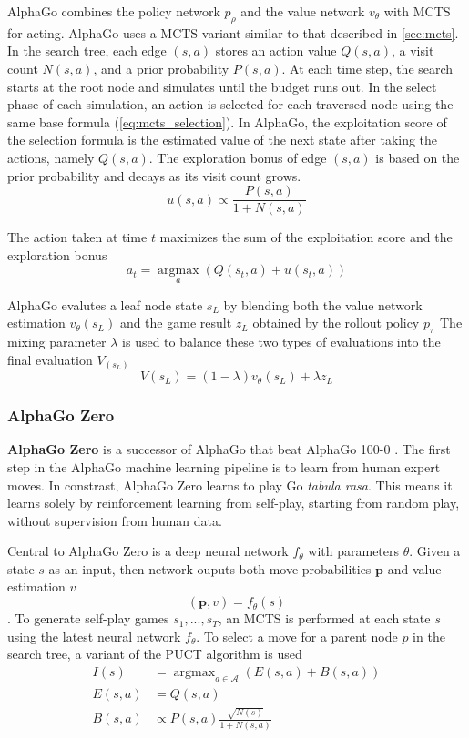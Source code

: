 \documentclass[12pt]{article}
\begin{document}
AlphaGo combines the policy network $p_{\rho}$ and the value network $v_{\theta}$ with MCTS for acting.
AlphaGo uses a MCTS variant similar to that described in \ref{sec:mcts}.
In the search tree, each edge $(s, a)$ stores an action value $Q(s, a)$, a visit count $N(s, a)$, and a prior probability $P(s, a)$.
At each time step, the search starts at the root node and simulates until the budget runs out.
In the select phase of each simulation, an action is selected for each traversed node using the same base formula (\ref{eq:mcts_selection}).
In AlphaGo, the exploitation score of the selection formula is the estimated value of the next state after taking the actions, namely $Q(s, a)$.
The exploration bonus of edge $(s, a)$ is based on the prior probability and decays as its visit count grows.
\begin{equation}
    u(s, a) \propto \frac{P(s, a)}{1 + N(s, a)}
\end{equation}

The action taken at time $t$ maximizes the sum of the exploitation score and the exploration bonus
\begin{equation}
    a_{t}=\underset{a}{\operatorname{argmax}}\left(Q\left(s_{t}, a\right)+u\left(s_{t}, a\right)\right)
\end{equation}

AlphaGo evalutes a leaf node state $s_L$ by blending both the value network estimation $v_\theta(s_L)$ and the game result $z_L$ obtained by the rollout policy $p_\pi$
The mixing parameter $\lambda$ is used to balance these two types of evaluations into the final evaluation $V_(s_L)$
$$
    V\left(s_{L}\right)=(1-\lambda) v_{\theta}\left(s_{L}\right)+\lambda z_{L}
$$

\subsubsection{AlphaGo Zero}
\textbf{AlphaGo Zero} is a successor of AlphaGo that beat AlphaGo 100-0 \cite{MasteringGameGo_Silver.Schrittwieser.ea_2017}.
The first step in the AlphaGo machine learning pipeline is to learn from human expert moves.
In constrast, AlphaGo Zero learns to play Go \textit{tabula rasa}.
This means it learns solely by reinforcement learning from self-play, starting from random play, without supervision from human data.

Central to AlphaGo Zero is a deep neural network $f_\theta$ with parameters $\theta$.
Given a state $s$ as an input, then network ouputs both move probabilities $\pmb{p}$ and value estimation $v$
$$(\pmb{p}, v) = f_\theta(s)$$.
To generate self-play games $s_1, ..., s_T$, an MCTS is performed at each state $s$ using the latest neural network $f_\theta$.
To select a move for a parent node $p$ in the search tree, a variant of the PUCT algorithm is used
\begin{align*}
    I(s)     & = \operatorname{argmax}_{a \in \mathcal{A}} \left( E(s, a) + B(s, a) \right)  \\
    E(s, a)  & = Q(s, a)  \\
    B(s, a)  & \propto P(s, a) \frac{\sqrt{N(s)}}{1+N(s, a)}
\end{align*}
\end{document}
